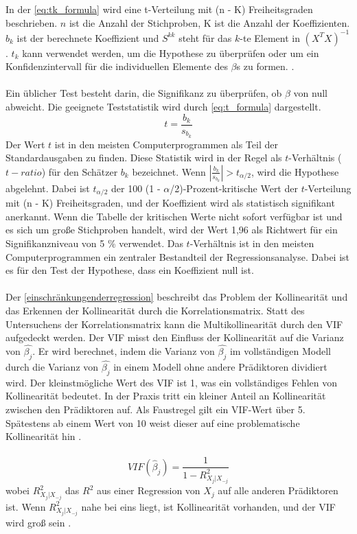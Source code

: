 In der \autoref{eq:tk_formula} wird eine t-Verteilung mit (n - K) Freiheitsgraden beschrieben. \(n\) ist die Anzahl der Stichproben, K ist die Anzahl der Koeffizienten. \(b_k\) ist der berechnete Koeffizient und $S^{kk}$ steht für das \(k\)-te Element in \((X^TX)^{-1}\). \(t_k\) kann verwendet werden, um die Hypothese zu überprüfen oder um ein Konfidenzintervall für die individuellen Elemente des $\beta$s zu formen.  \cite{greene2003econometric}.\\\\
Ein üblicher Test besteht darin, die Signifikanz zu überprüfen, ob $\beta$ von null abweicht. Die geeignete Teststatistik wird durch \autoref{eq:t_formula} dargestellt. 
\begin{equation}
t = \frac{b_k}{s_{b_k}}
\label{eq:t_formula}
\end{equation}
Der Wert \(t\) ist in den meisten Computerprogrammen als Teil der Standardausgaben zu finden. Diese Statistik wird in der Regel als \(t\)-Verhältnis (\(t-ratio\)) für den Schätzer \(b_k\) bezeichnet. Wenn \( \left|\frac{b_k}{s_{b_k}}\right| > t_{\alpha/2} \), wird die Hypothese abgelehnt. Dabei ist \( t_{\alpha/2} \) der 100 (1 - \(\alpha\)/2)-Prozent-kritische Wert der \(t\)-Verteilung mit (n - K) Freiheitsgraden, und der Koeffizient wird als statistisch signifikant anerkannt. Wenn die Tabelle der kritischen Werte nicht sofort verfügbar ist und es sich um große Stichproben handelt, wird der Wert 1,96 als Richtwert für ein Signifikanzniveau von 5 \% verwendet. Das \(t\)-Verhältnis ist in den meisten Computerprogrammen ein zentraler Bestandteil der Regressionsanalyse. Dabei ist es für den Test der Hypothese, dass ein Koeffizient null ist. \\\\
Der \autoref{einschränkungenderregression} beschreibt das Problem der Kollinearität und das Erkennen der Kollinearität durch die Korrelationsmatrix. Statt des Untersuchens der Korrelationsmatrix kann die Multikollinearität durch den \ac{VIF} aufgedeckt werden. Der \ac{VIF} misst den Einfluss der Kollinearität auf die Varianz von $\hat{\beta_j}$. Er wird berechnet, indem die Varianz von $\hat{\beta_j}$ im vollständigen Modell durch die Varianz von $\hat{\beta_j}$ in einem Modell ohne andere Prädiktoren dividiert wird. Der kleinstmögliche Wert des \ac{VIF} ist 1, was ein vollständiges Fehlen von Kollinearität bedeutet. In der Praxis tritt ein kleiner Anteil an Kollinearität zwischen den Prädiktoren auf. Als Faustregel gilt ein \ac{VIF}-Wert über 5. Spätestens ab einem Wert von 10 weist dieser auf eine problematische Kollinearität hin \cite{james2013introduction}. \\\\
\begin{equation}
VIF(\hat{\beta}_j) = \frac{1}{1 - R^2_{X_j|X_{-j}}}
\label{vif}
\end{equation}
wobei \( R^2_{X_j|X_{-j}} \) das \( R^2 \) aus einer Regression von \( X_j \) auf alle anderen Prädiktoren ist. Wenn \( R^2_{X_j|X_{-j}} \) nahe bei eins liegt, ist Kollinearität vorhanden, und der VIF wird groß sein \cite{james2013introduction}.\\\\
